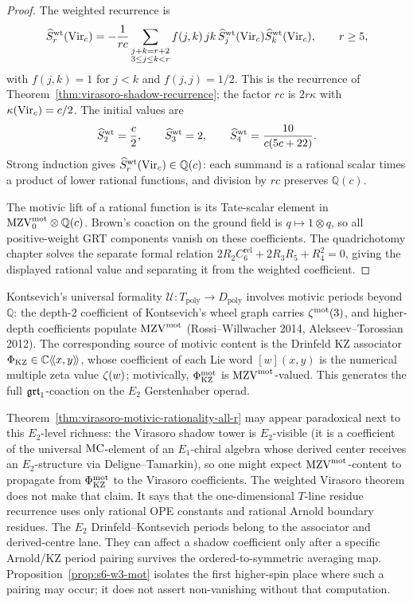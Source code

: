 \begin{proof}
The weighted recurrence is
\[
 \widehat S^{\rm wt}_r(\mathrm{Vir}_c)
 =
 -\frac{1}{r c}
 \sum_{\substack{j+k=r+2\\3\le j\le k<r}}
 f(j,k)\,jk\,
 \widehat S^{\rm wt}_j(\mathrm{Vir}_c)\widehat S^{\rm wt}_k(\mathrm{Vir}_c),
 \qquad r\ge5,
\]
with $f(j,k)=1$ for $j<k$ and $f(j,j)=1/2$. This is the recurrence of
Theorem~\ref{thm:virasoro-shadow-recurrence}; the factor $r c$ is
$2r\kappa$ with $\kappa(\mathrm{Vir}_c)=c/2$. The initial values are
\[
 \widehat S^{\rm wt}_2=\frac c2,\qquad
 \widehat S^{\rm wt}_3=2,\qquad
 \widehat S^{\rm wt}_4=\frac{10}{c(5c+22)}.
\]
Strong induction gives $\widehat S^{\rm wt}_r(\mathrm{Vir}_c)\in\mathbb Q(c)$:
each summand is a rational scalar times a product of lower rational
functions, and division by $r c$ preserves $\mathbb Q(c)$.

The motivic lift of a rational function is its Tate-scalar element in
$\mathrm{MZV}^{\mathrm{mot}}_0\otimes\mathbb Q(c)$. Brown's coaction on the ground field
is $q\mapsto 1\otimes q$, so all positive-weight GRT components vanish
on these coefficients.  The quadrichotomy chapter solves the separate
formal relation
$2R_2C_6^{\mathrm{rel}}+2R_3R_5+R_4^2=0$, giving the displayed rational
value and separating it from the weighted coefficient.
\end{proof}

\begin{remark}
Kontsevich's universal formality $\mathcal{U} \colon T_{\mathrm{poly}}
\to D_{\mathrm{poly}}$ involves motivic periods beyond
$\mathbb{Q}$: the depth-$2$ coefficient of Kontsevich's wheel graph
carries $\zeta^{\mathrm{mot}}(3)$, and higher-depth coefficients populate
$\mathrm{MZV}^{\mathrm{mot}}$ (Rossi--Willwacher 2014, Alekseev--Torossian 2012). The
corresponding source of motivic content is the Drinfeld KZ associator
$\Phi_{\mathrm{KZ}} \in \mathbb{C}\langle\!\langle x, y\rangle\!\rangle$, whose
coefficient of each Lie word $[w](x, y)$ is the numerical multiple
zeta value $\zeta(w)$; motivically,
$\Phi_{\mathrm{KZ}}^{\mathrm{mot}}$ is $\mathrm{MZV}^{\mathrm{mot}}$-valued. This generates the full
$\mathfrak{grt}_1$-coaction on the $E_2$ Gerstenhaber operad.

Theorem~\ref{thm:virasoro-motivic-rationality-all-r} may appear
paradoxical next to this $E_2$-level richness: the Virasoro shadow
tower is $E_2$-visible (it is a coefficient of the universal
$\mathrm{MC}$-element of an $E_1$-chiral algebra whose derived center receives
an $E_2$-structure via Deligne--Tamarkin), so one might expect
$\mathrm{MZV}^{\mathrm{mot}}$-content to propagate from $\Phi_{\mathrm{KZ}}^{\mathrm{mot}}$ to the
Virasoro coefficients. The weighted Virasoro theorem does not make that
claim. It says that the one-dimensional $T$-line residue recurrence
uses only rational OPE constants and rational Arnold boundary residues.
The $E_2$ Drinfeld--Kontsevich periods belong to the associator and
derived-centre lane. They can affect a shadow coefficient only after a
specific Arnold/KZ period pairing survives the ordered-to-symmetric
averaging map. Proposition~\ref{prop:s6-w3-mot} isolates the first
higher-spin place where such a pairing may occur; it does not assert
non-vanishing without that computation.
\end{remark}

